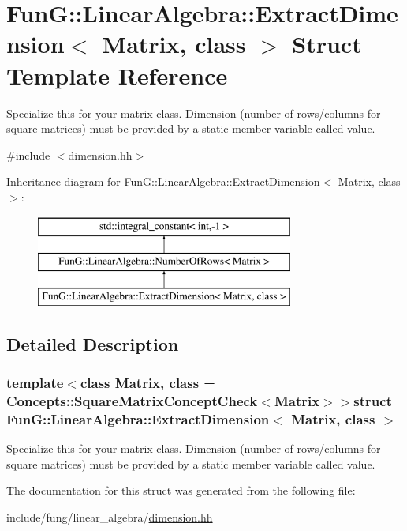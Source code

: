 \hypertarget{structFunG_1_1LinearAlgebra_1_1ExtractDimension}{\section{Fun\-G\-:\-:Linear\-Algebra\-:\-:Extract\-Dimension$<$ Matrix, class $>$ Struct Template Reference}
\label{structFunG_1_1LinearAlgebra_1_1ExtractDimension}
}


Specialize this for your matrix class. Dimension (number of rows/columns for square matrices) must be provided by a static member variable called value.  




{\ttfamily \#include $<$dimension.\-hh$>$}

Inheritance diagram for Fun\-G\-:\-:Linear\-Algebra\-:\-:Extract\-Dimension$<$ Matrix, class $>$\-:\begin{figure}[H]
\begin{center}
\leavevmode
\includegraphics[height=3.000000cm]{structFunG_1_1LinearAlgebra_1_1ExtractDimension}
\end{center}
\end{figure}


\subsection{Detailed Description}
\subsubsection*{template$<$class Matrix, class = Concepts\-::\-Square\-Matrix\-Concept\-Check$<$\-Matrix$>$$>$struct Fun\-G\-::\-Linear\-Algebra\-::\-Extract\-Dimension$<$ Matrix, class $>$}

Specialize this for your matrix class. Dimension (number of rows/columns for square matrices) must be provided by a static member variable called value. 

The documentation for this struct was generated from the following file\-:\begin{DoxyCompactItemize}
\item 
include/fung/linear\-\_\-algebra/\hyperlink{dimension_8hh}{dimension.\-hh}\end{DoxyCompactItemize}
